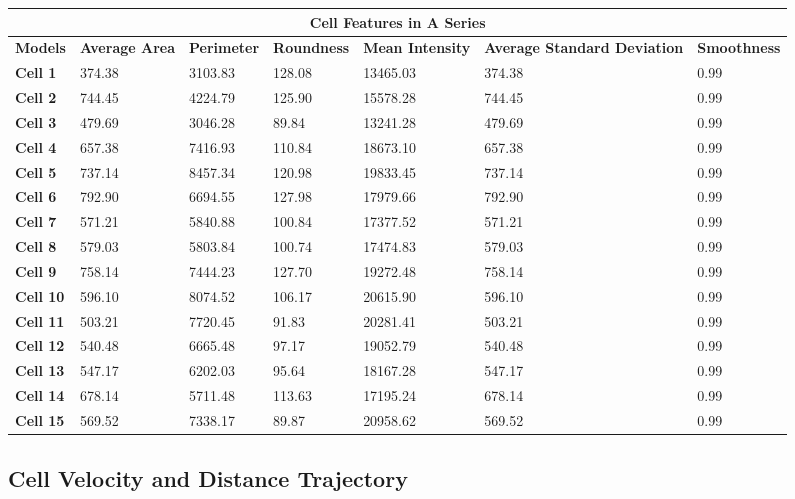 \documentclass{article}
\begin{document}
\begin{table}[h!]
\centering
\begin{tabular}{ |p{1.7cm}|p{1.7cm}|p{1.7cm}|p{1.7cm}|p{1.7cm}|p{1.7cm}|p{1.7cm}| }
\hline
\multicolumn{7}{|c|}{\textbf{Cell Features in A Series}} \\
\hline
\textbf{Models} & \textbf{Average Area} & \textbf{Perimeter} & \textbf{Roundness} & \textbf{Mean Intensity} & \textbf{Average Standard Deviation} & \textbf{Smoothness} \\
\hline
\textbf{Cell 1} & 374.38 & 3103.83 & 128.08 & 13465.03 & 374.38 & 0.99 \\
\textbf{Cell 2} & 744.45 & 4224.79 & 125.90 & 15578.28 & 744.45 & 0.99 \\
\textbf{Cell 3} & 479.69 & 3046.28 & 89.84 & 13241.28 & 479.69 & 0.99 \\
\textbf{Cell 4} & 657.38 & 7416.93 & 110.84 & 18673.10 & 657.38 & 0.99 \\
\textbf{Cell 5} & 737.14 & 8457.34 & 120.98 & 19833.45 & 737.14 & 0.99 \\
\textbf{Cell 6} & 792.90 & 6694.55 & 127.98 & 17979.66 & 792.90 & 0.99 \\
\textbf{Cell 7} & 571.21 & 5840.88 & 100.84 & 17377.52 & 571.21 & 0.99 \\
\textbf{Cell 8} & 579.03 & 5803.84 & 100.74 & 17474.83 & 579.03 & 0.99 \\
\textbf{Cell 9} & 758.14 & 7444.23 & 127.70 & 19272.48 & 758.14 & 0.99 \\
\textbf{Cell 10} & 596.10 & 8074.52 & 106.17 & 20615.90 & 596.10 & 0.99 \\
\textbf{Cell 11} & 503.21 & 7720.45 & 91.83 & 20281.41 & 503.21 & 0.99 \\
\textbf{Cell 12} & 540.48 & 6665.48 & 97.17 & 19052.79 & 540.48 & 0.99 \\
\textbf{Cell 13} & 547.17 & 6202.03 & 95.64 & 18167.28 & 547.17 & 0.99 \\
\textbf{Cell 14} & 678.14 & 5711.48 & 113.63 & 17195.24 & 678.14 & 0.99 \\
\textbf{Cell 15} & 569.52 & 7338.17 & 89.87 & 20958.62 & 569.52 & 0.99 \\
\hline
\end{tabular}
\end{table}







\subsection*{Cell Velocity and Distance Trajectory}
\end{document}
